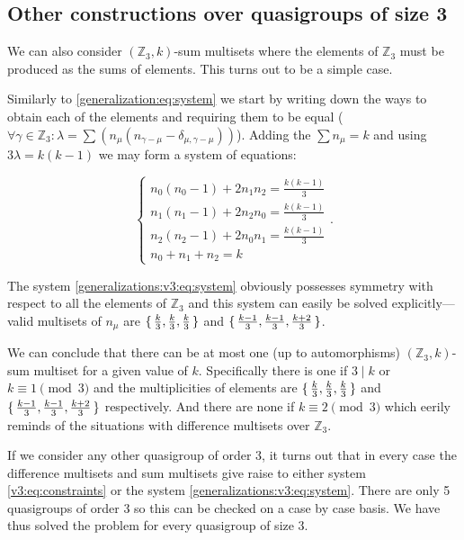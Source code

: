 \subsection{Other constructions over quasigroups of size 3}
    \label{sec:v3}
    We can also consider $(\mathbb Z_3,k)$-sum multisets where the elements of $\mathbb Z_3$ must be produced as the sums of elements. This turns out to be a simple case.

    Similarly to \eqref{generalization:eq:system} we start by writing down the ways to obtain each of the elements and requiring them to be equal ($\forall \gamma \in \mathbb Z_3 \colon  \lambda = \sum (n_\mu (n_{\gamma-\mu}-\delta_{\mu,\gamma-\mu}))$). Adding the $\sum n_\mu = k$ and using $3\lambda = k(k-1)$ we may form a system of equations:
    
    \begin{equation}
        \label{generalizations:v3:eq:system}
        \begin{cases}
            n_0 (n_0-1) + 2 n_1 n_2 = \frac{k(k-1)}{3} \\
            n_1 (n_1-1) + 2 n_2 n_0 = \frac{k(k-1)}{3} \\
            n_2 (n_2-1) + 2 n_0 n_1 = \frac{k(k-1)}{3} \\
            n_0 + n_1 + n_2 = k
        \end{cases}.
    \end{equation}

    The system \eqref{generalizations:v3:eq:system} obviously possesses symmetry with respect to all the elements of $\mathbb Z_3$ and this system can easily be solved explicitly---valid multisets of $n_\mu$ are $\set{\frac k 3, \frac k 3, \frac k 3}$ and $\set{\frac{k-1}{3}, \frac{k-1}{3}, \frac{k+2}{3}}$.
    
    We can conclude that there can be at most one (up to automorphisms) $(\mathbb Z_3, k)$-sum multiset for a given value of $k$. Specifically there is one if $3 \mid k$ or $k \equiv 1 \pmod 3$ and the multiplicities of elements are $\set{\frac k 3, \frac k 3, \frac k 3}$ and $\set{\frac{k-1}{3}, \frac{k-1}{3}, \frac{k+2}{3}}$ respectively. And there are none if $k \equiv 2 \pmod 3$ which eerily reminds of the situations with difference multisets over $\mathbb Z_3$.
    
    If we consider any other quasigroup of order 3, it turns out that in every case the difference multisets and sum multisets give raise to either system \eqref{v3:eq:constraints} or the system \eqref{generalizations:v3:eq:system}. There are only 5 quasigroups of order 3 so this can be checked on a case by case basis. We have thus solved the problem for every quasigroup of size 3.
    
